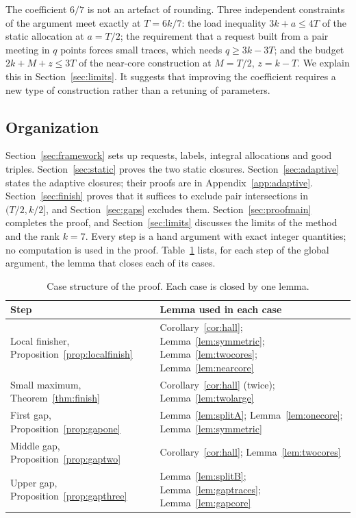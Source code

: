 \documentclass[11pt]{article}
\numberwithin{equation}{section}
\theoremstyle{definition}
\theoremstyle{remark}
\begin{document}
The coefficient $6/7$ is not an artefact of rounding. Three independent
constraints of the argument meet exactly at $T=6k/7$: the load
inequality $3k+a\le4T$ of the static allocation at $a=T/2$; the
requirement that a request built from a pair meeting in $q$ points
forces small traces, which needs $q\ge3k-3T$; and the budget
$2k+M+z\le3T$ of the near-core construction at $M=T/2$, $z=k-T$. We
explain this in Section~\ref{sec:limits}. It suggests that improving
the coefficient requires a new type of construction rather than a
retuning of parameters.

\subsection*{Organization}
Section~\ref{sec:framework} sets up requests, labels, integral
allocations and good triples. Section~\ref{sec:static} proves the two
static closures. Section~\ref{sec:adaptive} states the adaptive
closures; their proofs are in Appendix~\ref{app:adaptive}.
Section~\ref{sec:finish} proves that it suffices to exclude pair
intersections in $(T/2,k/2]$, and Section~\ref{sec:gaps} excludes them.
Section~\ref{sec:proofmain} completes the proof, and
Section~\ref{sec:limits} discusses the limits of the method and the
rank $k=7$. Every step is a hand argument with exact integer quantities;
no computation is used in the proof.
Table~\ref{tab:dependencies} lists, for each step of the global
argument, the lemma that closes each of its cases.

\begin{table}[ht]
\centering\small
\begin{tabular}{>{\raggedright\arraybackslash}p{}>{\raggedright\arraybackslash}p{}}
\toprule
Step & Lemma used in each case\\
\midrule
Local finisher, Proposition~\ref{prop:localfinish}
 & Corollary~\ref{cor:hall}; Lemma~\ref{lem:symmetric}; Lemma~\ref{lem:twocores}; Lemma~\ref{lem:nearcore}\\
Small maximum, Theorem~\ref{thm:finish}
 & Corollary~\ref{cor:hall} (twice); Lemma~\ref{lem:twolarge}\\
First gap, Proposition~\ref{prop:gapone}
 & Lemma~\ref{lem:splitA}; Lemma~\ref{lem:onecore}; Lemma~\ref{lem:symmetric}\\
Middle gap, Proposition~\ref{prop:gaptwo}
 & Corollary~\ref{cor:hall}; Lemma~\ref{lem:twocores}\\
Upper gap, Proposition~\ref{prop:gapthree}
 & Lemma~\ref{lem:splitB}; Lemma~\ref{lem:gaptraces}; Lemma~\ref{lem:gapcore}\\
\bottomrule
\end{tabular}
\caption{Case structure of the proof. Each case is closed by one lemma.}
\label{tab:dependencies}
\end{table}
\end{document}
